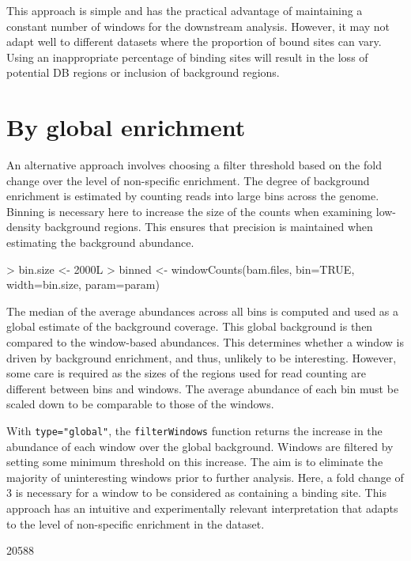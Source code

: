 \documentclass[12pt]{report}
\renewenvironment{Schunk}{\vspace{0pt}}{\vspace{0pt}}
\newcommand{\code}[1]{{\small\texttt{#1}}}
\begin{document}
This approach is simple and has the practical advantage of maintaining a constant number of windows for the downstream analysis. 
However, it may not adapt well to different datasets where the proportion of bound sites can vary.
Using an inappropriate percentage of binding sites will result in the loss of potential DB regions or inclusion of background regions.

\section{By global enrichment}
\label{sec:global_filter}
An alternative approach involves choosing a filter threshold based on the fold change over the level of non-specific enrichment.
The degree of background enrichment is estimated by counting reads into large bins across the genome.
Binning is necessary here to increase the size of the counts when examining low-density background regions. 
This ensures that precision is maintained when estimating the background abundance.

\begin{Schunk}
\begin{Sinput}
> bin.size <- 2000L
> binned <- windowCounts(bam.files, bin=TRUE, width=bin.size, param=param)
\end{Sinput}
\end{Schunk}

The median of the average abundances across all bins is computed and used as a global estimate of the background coverage.
This global background is then compared to the window-based abundances.
This determines whether a window is driven by background enrichment, and thus, unlikely to be interesting.
However, some care is required as the sizes of the regions used for read counting are different between bins and windows.
The average abundance of each bin must be scaled down to be comparable to those of the windows.

With \code{type="global"}, the \code{filterWindows} function returns the increase in the abundance of each window over the global background.
Windows are filtered by setting some minimum threshold on this increase.
The aim is to eliminate the majority of uninteresting windows prior to further analysis.
Here, a fold change of 3 is necessary for a window to be considered as containing a binding site. 
This approach has an intuitive and experimentally relevant interpretation that adapts to the level of non-specific enrichment in the dataset. 

\begin{Schunk}
\begin{Soutput}
[1] 20588
\end{Soutput}
\end{Schunk}
\end{document}
